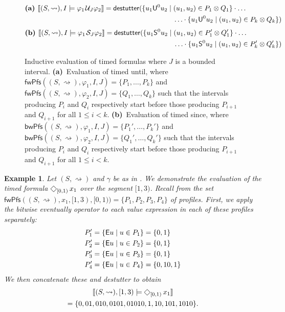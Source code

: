 \documentclass[iicol,lineno]{sn-jnl}
\renewcommand{\cref}{\Cref}
\newcommand{\hb}{\rightsquigarrow}
\newcommand{\destutter}{\mathsf{destutter}}
\renewcommand{\LTLf}{\LTLdiamond}
\let\LTLeventually\LTLf
\def\until{\kern.1em\mathcal{U}}
\def\since{\kern.1em\mathcal{S}}
\newcommand{\?}{\text{?}}
\newcommand{\suchthat}{\;\ifnum\currentgrouptype=16 \middle\fi|\;}
\let\st\suchthat
\newtheorem{example}{Example}
\begin{document}
	\begin{figure}[!t]
		\begin{align*}
			\textbf{(a) }
			\llbracket (S, {\hb}), I \models \varphi_1 \until_J \varphi_2 \rrbracket = \destutter( \{ u_1 \mathsf{U}^0 u_2 \st &(u_1, u_2) \in P_1 \otimes Q_1 \} \cdot \ldots \\ 
			&\ldots \cdot \{ u_1 \mathsf{U}^0 u_2 \st (u_1, u_2) \in P_k \otimes Q_k \} )
		\end{align*}
		\begin{align*}
			\textbf{(b) }
			\llbracket (S, {\hb}), I \models \varphi_1 \since_J \varphi_2 \rrbracket = \destutter( \{ u_1 \mathsf{S}^0 u_2 \st &(u_1, u_2) \in P_1' \otimes Q_1' \} \cdot \ldots \\ 
			&\ldots \cdot \{ u_1 \mathsf{S}^0 u_2 \st (u_1, u_2) \in P_k' \otimes Q_k' \} )
		\end{align*}
		\caption{Inductive evaluation of timed formulas where $J$ is a bounded interval.
			\textbf{(a)}~Evaluation of timed until, where $\mathsf{fwPfs}((S,{\hb}), \varphi_1, I, J) = \{P_1, \ldots, P_k \}$ and $\mathsf{fwPfs}((S,{\hb}), \varphi_2, I, J) = \{Q_1, \ldots, Q_k \}$ such that the intervals producing $P_i$ and $Q_i$ respectively start before those producing $P_{i+1}$ and $Q_{i+1}$ for all $1 \leq i < k$.
			\textbf{(b)}~Evaluation of timed since, where $\mathsf{bwPfs}((S,{\hb}), \varphi_1, I, J) = \{P_1', \ldots, P_k' \}$ and $\mathsf{bwPfs}((S,{\hb}), \varphi_2, I, J) = \{Q_1', \ldots, Q_k' \}$ such that the intervals producing $P_i$ and $Q_i$ respectively start before those producing $P_{i+1}$ and $Q_{i+1}$ for all $1 \leq i < k$.
			\label{fig:timedEval}}
	\end{figure}
	
	\begin{example} \label{ex:timed}
		Let $(S, {\hb})$ and $\gamma$ be as in \cref{fig:csve}.
		We demonstrate the evaluation of the timed formula $\LTLeventually_{[0,1)} x_1$ over the segment $[1,3)$.
		Recall from \cref{ex:profiles} the set $\mathsf{fwPfs}((S,{\hb}), x_1, [1,3), [0,1)) = \{P_1, P_2, P_3, P_4\}$ of profiles.
		First, we apply the bitwise eventually operator to each value expression in each of these profiles separately:
		\begin{align*}
			P_1' &= \{ \mathsf{E} u \st u \in P_1 \} = \{ 0, 1 \} \\
			P_2' &= \{ \mathsf{E} u \st u \in P_2 \} = \{ 0, 1 \} \\
			P_3' &= \{ \mathsf{E} u \st u \in P_3 \} = \{ 0, 1 \} \\
			P_4' &= \{ \mathsf{E} u \st u \in P_4 \} = \{ 0, 10, 1 \} \\
		\end{align*}
		We then concatenate these and destutter to obtain 
		\begin{multline*}
			\llbracket (S, {\hb}), [1,3) \models \LTLeventually_{[0,1)} x_1 \rrbracket \\= \{ 0, 01, 010, 0101, 01010, 1, 10, 101, 1010 \}. 
		\end{multline*}
	\end{example}
	
\end{document}
